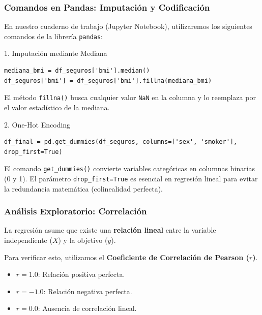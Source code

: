 \documentclass{beamer}
\begin{document}
\begin{frame}[fragile]
\frametitle{Comandos en Pandas: Imputación y Codificación}
En nuestro cuaderno de trabajo (Jupyter Notebook), utilizaremos los siguientes comandos de la librería \texttt{pandas}:

\begin{block}{1. Imputación mediante Mediana}
\begin{lstlisting}
mediana_bmi = df_seguros['bmi'].median()
df_seguros['bmi'] = df_seguros['bmi'].fillna(mediana_bmi)
\end{lstlisting}
El método \texttt{fillna()} busca cualquier valor \texttt{NaN} en la columna y lo reemplaza por el valor estadístico de la mediana.
\end{block}

\begin{block}{2. One-Hot Encoding}
\begin{lstlisting}
df_final = pd.get_dummies(df_seguros, columns=['sex', 'smoker'], drop_first=True)
\end{lstlisting}
El comando \texttt{get\_dummies()} convierte variables categóricas en columnas binarias (0 y 1). El parámetro \texttt{drop\_first=True} es esencial en regresión lineal para evitar la redundancia matemática (colinealidad perfecta).
\end{block}
\end{frame}

\begin{frame}
\frametitle{Análisis Exploratorio: Correlación}
La regresión asume que existe una \textbf{relación lineal} entre la variable independiente ($X$) y la objetivo ($y$). 

Para verificar esto, utilizamos el \textbf{Coeficiente de Correlación de Pearson ($r$)}.
\begin{itemize}
    \item $r = 1.0$: Relación positiva perfecta.
    \item $r = -1.0$: Relación negativa perfecta.
    \item $r = 0.0$: Ausencia de correlación lineal.
\end{itemize}
\end{frame}
\end{document}
